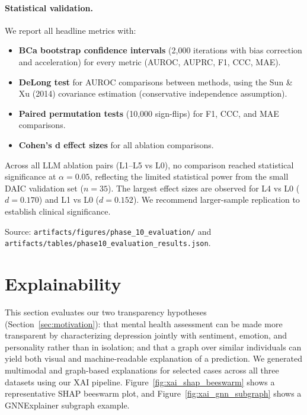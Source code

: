\documentclass[12pt,oneside]{book}
\begin{document}
\paragraph{Statistical validation.} We report all headline metrics with:
\begin{itemize}
    \item \textbf{BCa bootstrap confidence intervals} (2,000 iterations with bias correction and acceleration) for every metric (AUROC, AUPRC, F1, CCC, MAE).
    \item \textbf{DeLong test} for AUROC comparisons between methods, using the Sun \& Xu (2014) covariance estimation (conservative independence assumption).
    \item \textbf{Paired permutation tests} (10,000 sign-flips) for F1, CCC, and MAE comparisons.
    \item \textbf{Cohen's d effect sizes} for all ablation comparisons.
\end{itemize}

Across all LLM ablation pairs (L1--L5 vs L0), no comparison reached statistical significance at $\alpha=0.05$, reflecting the limited statistical power from the small DAIC validation set ($n=35$). The largest effect sizes are observed for L4 vs L0 ($d=0.170$) and L1 vs L0 ($d=0.152$). We recommend larger-sample replication to establish clinical significance.

Source: \texttt{artifacts/figures/phase\_10\_evaluation/} and \texttt{artifacts/tables/phase10\_evaluation\_results.json}.

\section{Explainability}
\label{sec:xai}
This section evaluates our two transparency hypotheses (Section~\ref{sec:motivation}): that mental health assessment can be made more transparent by characterizing depression jointly with sentiment, emotion, and personality rather than in isolation; and that a graph over similar individuals can yield both visual and machine-readable explanation of a prediction. We generated multimodal and graph-based explanations for selected cases across all three datasets using our XAI pipeline. Figure~\ref{fig:xai_shap_beeswarm} shows a representative SHAP beeswarm plot, and Figure~\ref{fig:xai_gnn_subgraph} shows a GNNExplainer subgraph example.
\end{document}
